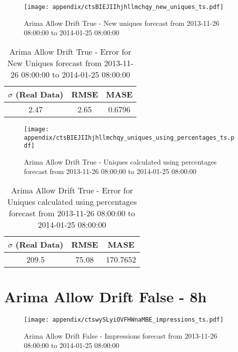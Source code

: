 \begin{figure}[H] \begin{center} \leavevmode
\texttt{[image: appendix/ctsBIEJIIhjhllmchqy\_new\_uniques\_ts.pdf]} \caption{
Arima Allow Drift True - New uniques forecast from 2013-11-26 08:00:00 to 2014-01-25 08:00:00} \label{fig:appendix/ctsBIEJIIhjhllmchqy_new_uniques_ts.pdf} \end{center}
\end{figure}

\begin{table}[H]
\centering
\footnotesize
\begin{tabular}{ccc}
$\sigma$ (Real Data) & RMSE & MASE   \\ \hline
2.47 & 2.65 & 0.6796 \\
\end{tabular}

\vspace{0.5cm}

\caption{
Arima Allow Drift True - Error for New Uniques forecast from 2013-11-26 08:00:00 to 2014-01-25 08:00:00}
\end{table}

\begin{figure}[H] \begin{center} \leavevmode
\texttt{[image: appendix/ctsBIEJIIhjhllmchqy\_uniques\_using\_percentages\_ts.pdf]} \caption{
Arima Allow Drift True - Uniques calculated using percentages forecast from 2013-11-26 08:00:00 to 2014-01-25 08:00:00} \label{fig:appendix/ctsBIEJIIhjhllmchqy_uniques_using_percentages_ts.pdf} \end{center}
\end{figure}

\begin{table}[H]
\centering
\footnotesize
\begin{tabular}{ccc}
$\sigma$ (Real Data) & RMSE & MASE   \\ \hline
209.5 & 75.08 & 170.7652 \\
\end{tabular}

\vspace{0.5cm}

\caption{
Arima Allow Drift True - Error for Uniques calculated using percentages forecast from 2013-11-26 08:00:00 to 2014-01-25 08:00:00}
\end{table}

\section{Arima Allow Drift False - 8h}
\begin{figure}[H] \begin{center} \leavevmode
\texttt{[image: appendix/ctswySLyiOVFHWnaMBE\_impressions\_ts.pdf]} \caption{
Arima Allow Drift False - Impressions forecast from 2013-11-26 08:00:00 to 2014-01-25 08:00:00} \label{fig:appendix/ctswySLyiOVFHWnaMBE_impressions_ts.pdf} \end{center}
\end{figure}

